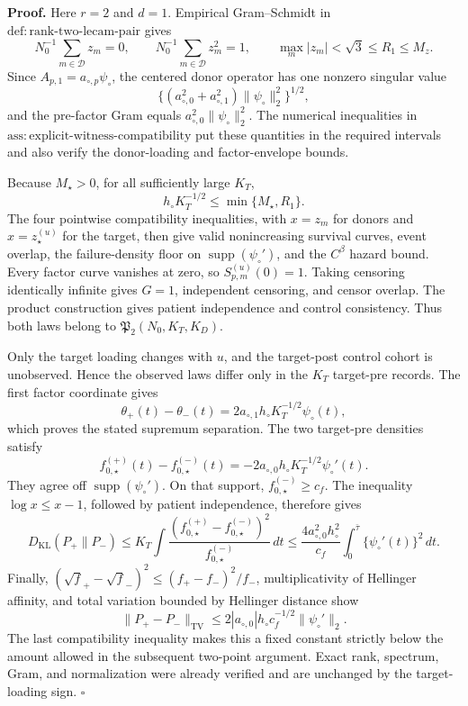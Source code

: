 \textbf{Proof.}
Here \(r=2\) and \(d=1\).  Empirical Gram--Schmidt in \(\mathrm{def:rank\mbox{-}two\mbox{-}lecam\mbox{-}pair}\) gives
\[
 N_0^{-1}\sum_{m\in\mathcal D}z_m=0,\qquad
 N_0^{-1}\sum_{m\in\mathcal D}z_m^2=1,\qquad
 \max_m|z_m|<\sqrt3\le R_1\le M_z.
\]
Since \(A_{p,1}=a_{\circ,p}\psi_\circ\), the centered donor operator has one nonzero singular value
\[
 \{(a_{\circ,0}^2+a_{\circ,1}^2)\|\psi_\circ\|_2^2\}^{1/2},
\]
and the pre-factor Gram equals \(a_{\circ,0}^2\|\psi_\circ\|_2^2\).  The numerical inequalities in \(\mathrm{ass:explicit\mbox{-}witness\mbox{-}compatibility}\) put these quantities in the required intervals and also verify the donor-loading and factor-envelope bounds.

Because \(M_\star>0\), for all sufficiently large \(K_T\),
\[
 h_\circ K_T^{-1/2}\le\min\{M_\star,R_1\}.
\]
The four pointwise compatibility inequalities, with \(x=z_m\) for donors and \(x=z_\star^{(u)}\) for the target, then give valid nonincreasing survival curves, event overlap, the failure-density floor on \(\operatorname{supp}(\psi_\circ')\), and the \(C^\beta\) hazard bound.  Every factor curve vanishes at zero, so \(S_{p,m}^{(u)}(0)=1\).  Taking censoring identically infinite gives \(G=1\), independent censoring, and censor overlap.  The product construction gives patient independence and control consistency.  Thus both laws belong to \(\mathfrak P_2(N_0,K_T,K_D)\).

Only the target loading changes with \(u\), and the target-post control cohort is unobserved.  Hence the observed laws differ only in the \(K_T\) target-pre records.  The first factor coordinate gives
\[
 \theta_+(t)-\theta_-(t)
 =2a_{\circ,1}h_\circ K_T^{-1/2}\psi_\circ(t),
\]
which proves the stated supremum separation.  The two target-pre densities satisfy
\[
 f_{0,\star}^{(+)}(t)-f_{0,\star}^{(-)}(t)
 =-2a_{\circ,0}h_\circ K_T^{-1/2}\psi_\circ'(t).
\]
They agree off \(\operatorname{supp}(\psi_\circ')\).  On that support, \(f_{0,\star}^{(-)}\ge c_f\).  The inequality \(\log x\le x-1\), followed by patient independence, therefore gives
\[
 D_{\mathrm{KL}}(P_+\|P_-)
 \le K_T\int\frac{(f_{0,\star}^{(+)}-f_{0,\star}^{(-)})^2}{f_{0,\star}^{(-)}}\,dt
 \le\frac{4a_{\circ,0}^2h_\circ^2}{c_f}
 \int_0^{\bar\tau}\{\psi_\circ'(t)\}^2\,dt.
\]
Finally, \((\sqrt f_+-\sqrt f_-)^2\le(f_+-f_-)^2/f_-\), multiplicativity of Hellinger affinity, and total variation bounded by Hellinger distance show
\[
 \|P_+-P_-\|_{\mathrm{TV}}
 \le2|a_{\circ,0}|h_\circ c_f^{-1/2}\|\psi_\circ'\|_2.
\]
The last compatibility inequality makes this a fixed constant strictly below the amount allowed in the subsequent two-point argument.  Exact rank, spectrum, Gram, and normalization were already verified and are unchanged by the target-loading sign. \(\square\)